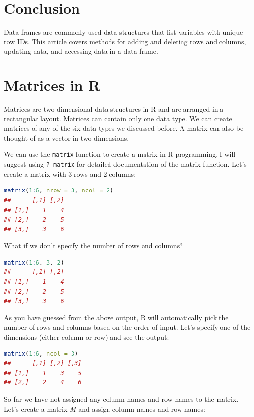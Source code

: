 \documentclass[10pt]{book}
\begin{document}
\section{Conclusion}
Data frames are commonly used data structures that list variables with unique row IDs. This article covers methods for adding and deleting rows and columns, updating data, and accessing data in a data frame.








\section{Matrices in R}

Matrices are two-dimensional data structures in R and are arranged in a rectangular layout. Matrices can contain only one data type. We can create matrices of any of the six data types we discussed before. A matrix can also be thought of as a vector in two dimensions.

We can use the \texttt{matrix} function to create a matrix in R programming. I will suggest using \texttt{? matrix} for detailed documentation of the matrix function. Let’s create a matrix with 3 rows and 2 columns:

\begin{lstlisting}[language=R]
matrix(1:6, nrow = 3, ncol = 2)
##      [,1] [,2]
## [1,]    1    4
## [2,]    2    5
## [3,]    3    6
\end{lstlisting}

What if we don’t specify the number of rows and columns?

\begin{lstlisting}[language=R]
matrix(1:6, 3, 2)
##      [,1] [,2]
## [1,]    1    4
## [2,]    2    5
## [3,]    3    6
\end{lstlisting}

As you have guessed from the above output, R will automatically pick the number of rows and columns based on the order of input. Let’s specify one of the dimensions (either column or row) and see the output:

\begin{lstlisting}[language=R]
matrix(1:6, ncol = 3)
##      [,1] [,2] [,3]
## [1,]    1    3    5
## [2,]    2    4    6
\end{lstlisting}

So far we have not assigned any column names and row names to the matrix. Let’s create a matrix \( M \) and assign column names and row names:
\end{document}
